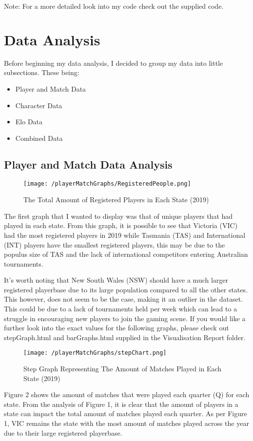 \documentclass[11pt, oneside, a4paper]{article}
\begin{document}
Note: For a more detailed look into my code check out the supplied code.
\newpage

\section{Data Analysis}
Before beginning my data analysis, I decided to group my data into little subsections. These being:
\begin{itemize}
	\item{Player and Match Data}
	\item{Character Data}
	\item{Elo Data}
	\item{Combined Data}
\end{itemize}


\subsection{Player and Match Data Analysis}
\begin{figure}[!ht]
	\centerline{\texttt{[image: /playerMatchGraphs/RegisteredPeople.png]}}
	\caption{The Total Amount of Registered Players in Each State (2019)}
	\label{fig:figure1}
\end{figure}
The first graph that I wanted to display was that of unique players that had played in each state. From this graph, it is possible to see that Victoria (VIC) had the most registered players in 2019 while Tasmania (TAS) and International (INT) players have the smallest registered players, this may be due to the populus size of TAS and the lack of international competitors entering Australian tournaments. 

It's worth noting that New South Wales (NSW) should have a much larger registered playerbase due to its large population compared to all the other states. This however, does not seem to be the case, making it an outlier in the dataset. This could be due to a lack of tournaments held per week which can lead to a struggle in encouraging new players to join the gaming scene. If you would like a further look into the exact values for the following graphs, please check out stepGraph.html and barGraphs.html supplied in the Visualisation Report folder.

\newpage

\begin{figure}[!ht]
	\centerline{\texttt{[image: /playerMatchGraphs/stepChart.png]}}
	\caption{Step Graph Representing The Amount of Matches Played in Each State (2019)}
	\label{fig:figure2}
\end{figure}
Figure 2 shows the amount of matches that were played each quarter (Q) for each state. From the analysis of Figure 1, it is clear that the amount of players in a state can impact the total amount of matches played each quarter. As per Figure 1, VIC remains the state with the most amount of matches played across the year due to their large registered playerbase. 
\end{document}
